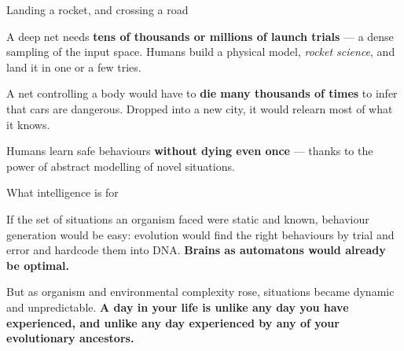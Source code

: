\documentclass[aspectratio=169,11pt,t]{beamer}
\begin{document}
\begin{frame}[shrink=25]{Landing a rocket, and crossing a road}
\begin{minipage}[t]{0.494\textwidth}
\begin{icardwarn}
A deep net needs \textbf{tens of thousands or millions of launch trials} --- a dense sampling of the input space. Humans build a physical model, \textit{rocket science}, and land it in one or a few tries.
\end{icardwarn}
\end{minipage}%
\hfill
\begin{minipage}[t]{0.494\textwidth}
\begin{icardwarn}
A net controlling a body would have to \textbf{die many thousands of times} to infer that cars are dangerous. Dropped into a new city, it would relearn most of what it knows.
\end{icardwarn}
\end{minipage}%
{\fontsize{9.4}{12.6}\selectfont\color{fg2}Humans learn safe behaviours \textbf{without dying even once} --- thanks to the power of abstract modelling of novel situations.\par}\vskip 4pt
\end{frame}

\begin{frame}[shrink=25]{What intelligence is for}
{\fontsize{9.4}{12.6}\selectfont\color{fg2}If the set of situations an organism faced were static and known, behaviour generation would be easy: evolution would find the right behaviours by trial and error and hardcode them into DNA. \textbf{Brains as automatons would already be optimal.}\par}\vskip 4pt
{\fontsize{9.4}{12.6}\selectfont\color{fg2}But as organism and environmental complexity rose, situations became dynamic and unpredictable. \textbf{A day in your life is unlike any day you have experienced, and unlike any day experienced by any of your evolutionary ancestors.}\par}\vskip 4pt
\begin{iquote}
\end{iquote}
\end{frame}
\end{document}
